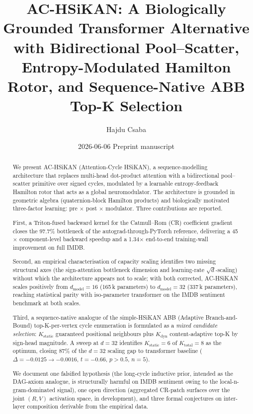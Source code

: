 \documentclass[11pt, a4paper]{article}
\title{\textbf{AC-HSiKAN: A Biologically Grounded Transformer Alternative
       with Bidirectional Pool--Scatter, Entropy-Modulated Hamilton
       Rotor, and Sequence-Native ABB Top-K Selection}}
\author[1]{Hajdu Csaba}
\affil[1]{Computational Neuroscience and AI Group, Budapest, Hungary\\
          \texttt{hajdu.csaba@example.org}}
\date{2026-06-06 \textemdash{} Preprint manuscript}
\begin{document}
\maketitle

\begin{abstract}\noindent
We present AC-HSiKAN (Attention-Cycle HSiKAN), a sequence-modelling
architecture that replaces multi-head dot-product attention with a
bidirectional pool--scatter primitive over signed cycles, modulated by
a learnable entropy-feedback Hamilton rotor that acts as a global
neuromodulator. The architecture is grounded in geometric algebra
(quaternion-block Hamilton products) and biologically motivated
three-factor learning: pre $\times$ post $\times$ modulator. Three
contributions are reported.

First, a Triton-fused backward kernel for the Catmull--Rom (CR)
coefficient gradient closes the 97.7\% bottleneck of the
autograd-through-PyTorch reference, delivering a 45$\times$
component-level backward speedup and a 1.34$\times$ end-to-end
training-wall improvement on full IMDB.

Second, an empirical characterisation of capacity scaling identifies
two missing structural axes (the sign-attention bottleneck dimension
and learning-rate $\sqrt{d}$-scaling) without which the architecture
appears not to scale; with both corrected, AC-HSiKAN scales positively
from $d_{\text{model}} = 16$ (165\,k parameters) to
$d_{\text{model}} = 32$ (337\,k parameters), reaching statistical
parity with iso-parameter transformer on the IMDB sentiment benchmark
at both scales.

Third, a sequence-native analogue of the simple-HSiKAN ABB
(Adaptive Branch-and-Bound) top-K-per-vertex cycle enumeration is
formulated as a \emph{mixed candidate selection}: $K_{\text{static}}$
guaranteed positional neighbours plus $K_{\text{dyn}}$ content-adaptive
top-K by sign-head magnitude. A sweep at $d=32$ identifies
$K_{\text{static}}=6$ of $K_{\text{total}}=8$ as the optimum, closing
87\% of the $d=32$ scaling gap to transformer baseline
($\Delta = -0.0125 \to -0.0016$, $t = -0.66$, $p > 0.5$, $n=5$).

We document one falsified hypothesis (the long-cycle inductive prior,
intended as the DAG-axiom analogue, is structurally harmful on IMDB
sentiment owing to the local-n-gram-dominated signal), one open
direction (aggregated CR-patch surfaces over the joint $(R, V)$
activation space, in development), and three formal conjectures on
inter-layer composition derivable from the empirical data.

\end{abstract}
\end{document}
